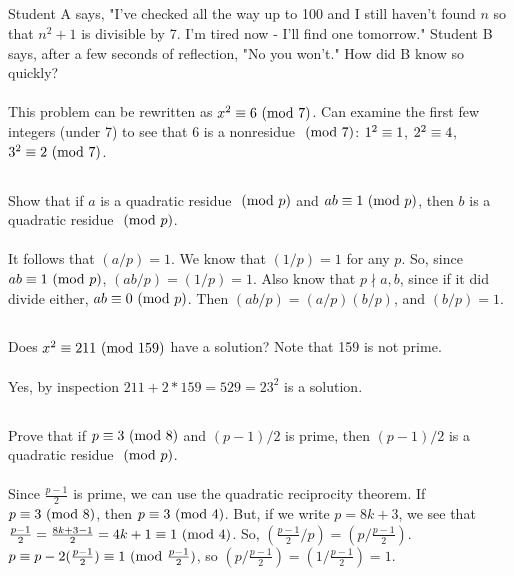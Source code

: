 \documentclass{article} \usepackage{amsmath}
\begin{document}
\subsection{}
Student A says, "I've checked all the way up to 100 and I still haven't found
$n$ so that $n^2 + 1$ is divisible by 7. I'm tired now - I'll find one tomorrow."
Student B says, after a few seconds of reflection, "No you won't."
How did B know so quickly?\\~\\
This problem can be rewritten as $x^2 \equiv 6 \ (\mathrm{mod}\ 7)$.
Can examine the first few integers (under 7) to see that 6 is a nonresidue
$\ (\mathrm{mod}\ 7)$: $1^2 \equiv 1$, $2^2 \equiv 4$, $3^2 \equiv 2 \ (\mathrm{mod}\ 7)$.

\subsection{}
Show that if $a$ is a quadratic residue $\ (\mathrm{mod}\ p)$ and $ab \equiv 1 \ (\mathrm{mod}\ p)$,
then $b$ is a quadratic residue $\ (\mathrm{mod}\ p)$.\\~\\
It follows that $(a/p) = 1$.
We know that $(1/p) = 1$ for any $p$.
So, since $ab \equiv 1 \ (\mathrm{mod}\ p)$, $(ab/p) = (1/p) = 1$.
Also know that $p \nmid a, b$, since if it did divide either, $ab \equiv 0 \ (\mathrm{mod}\ p)$.
Then $(ab/p) = (a/p)(b/p)$, and $(b/p) = 1$.

\subsection{}
Does $x^2 \equiv 211 \ (\mathrm{mod}\ 159)$ have a solution? Note that 159 is not prime.\\~\\
Yes, by inspection $211 + 2 * 159 = 529 = 23^2$ is a solution.

\subsection{}
Prove that if $p \equiv 3 \ (\mathrm{mod}\ 8)$ and $(p - 1)/2$ is prime,
then $(p - 1)/2$ is a quadratic residue $\ (\mathrm{mod}\ p)$.\\~\\
Since $\frac{p-1}{2}$ is prime, we can use the quadratic reciprocity theorem.
If $p \equiv 3 \ (\mathrm{mod}\ 8)$, then $p \equiv 3 \ (\mathrm{mod}\ 4)$.
But, if we write $p = 8k + 3$, we see that
$\frac{p - 1}{2} = \frac{8k + 3 - 1}{2} = 4k + 1 \equiv 1 \ (\mathrm{mod}\ 4)$.
So, $(\frac{p-1}{2}/p) = (p/\frac{p-1}{2})$.
$p \equiv p - 2(\frac{p-1}{2}) \equiv 1 \ (\mathrm{mod}\ \frac{p-1}{2})$,
so $(p/\frac{p-1}{2}) = (1/\frac{p-1}{2}) = 1$.
\end{document}
